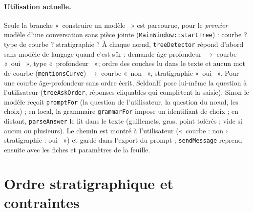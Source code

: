 \documentclass[11pt,a4paper]{article}
\providecommand{\og}{«~}\providecommand{\fg}{\unskip~»}
\newcommand{\code}[1]{\texttt{\small #1}}
\begin{document}
\paragraph{Utilisation actuelle.} Seule la branche \og construire un modèle \fg{} est parcourue, pour le
\emph{premier} modèle d'une conversation sans pièce jointe (\code{MainWindow::startTree}) : courbe ? type de courbe ?
stratigraphie ? À chaque nœud, \code{treeDetector} répond d'abord sans modèle de langage quand c'est sûr : demande
âge-profondeur $\to$ courbe \og oui \fg, type \og profondeur \fg ; ordre des couches lu dans le texte et aucun mot de
courbe (\code{mentionsCurve}) $\to$ courbe \og non \fg, stratigraphie \og oui \fg. Pour une courbe âge-profondeur sans
ordre écrit, SeldonH pose lui-même la question à l'utilisateur (\code{treeAskOrder}, réponses cliquables qui complètent
la saisie). Sinon le modèle reçoit \code{promptFor} (la question de l'utilisateur, la question du nœud, les choix) ; en
local, la grammaire \code{grammarFor} impose un identifiant de choix ; en distant, \code{parseAnswer} le lit dans le
texte (guillemets, gras, point tolérés ; vide si aucun ou plusieurs). Le chemin est montré à l'utilisateur
(\og courbe : non › stratigraphie : oui \fg) et gardé dans l'export du prompt ; \code{sendMessage} reprend ensuite avec
les fiches et paramètres de la feuille.

\section{Ordre stratigraphique et contraintes}\label{sec:strati}
\end{document}
